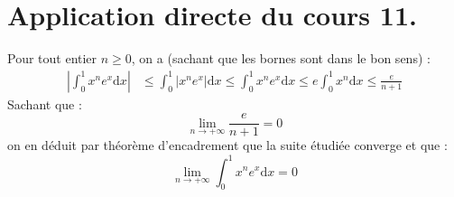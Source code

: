 \documentclass[french,11pt,twoside]{VcCours}
\newcommand{\dx}{\text{d}x}
\begin{document}
\medskip

\section*{Application directe du cours 11.}

Pour tout entier $n \geq 0$, on a (sachant que les bornes sont dans le bon sens) :
\begin{align*}
\left\vert \int_{0}^1 x^n e^{x} \dx \right\vert 
& \leq  \int_{0}^1 \vert x^n e^x \vert \dx 
 \leq  \int_{0}^1  x^n e^x  \dx
 \leq e \int_{0}^1 x^n \dx
 \leq \frac{e}{n+1} 
\end{align*}
Sachant que :
$$ \lim_{n \rightarrow + \infty} \frac{e}{n+1} =0 $$
on en déduit par théorème d'encadrement que la suite étudiée converge et que :
$$ \lim_{n \rightarrow + \infty} \int_{0}^1 x^n e^{x} \dx = 0$$
\end{document}
